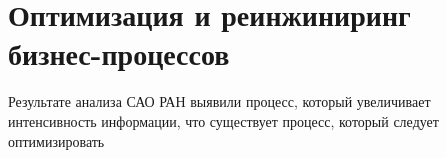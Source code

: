 \section{Оптимизация и реинжиниринг бизнес-процессов}

Результате анализа САО РАН выявили процесс, который увеличивает интенсивность информации,  что существует процесс, который следует оптимизировать

\pagebreak